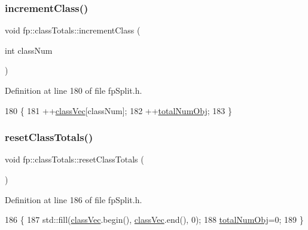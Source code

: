 \subsubsection{\texorpdfstring{increment\+Class()}{incrementClass()}}
{\footnotesize\ttfamily void fp\+::class\+Totals\+::increment\+Class (\begin{DoxyParamCaption}\item[{int}]{class\+Num }\end{DoxyParamCaption})\hspace{0.3cm}{\ttfamily [inline]}}



Definition at line 180 of file fp\+Split.\+h.


\begin{DoxyCode}
180                                                     \{
181                 ++\hyperlink{classfp_1_1classTotals_af96102537592dbda8601d0235dfccfca}{classVec}[classNum];
182                 ++\hyperlink{classfp_1_1classTotals_a97be63e3e4a1b7c553df839034828aae}{totalNumObj};
183             \}
\end{DoxyCode}
\mbox{\label{classfp_1_1classTotals_ab0ad9daa63bc410ae15f344b86386f87}} 
\subsubsection{\texorpdfstring{reset\+Class\+Totals()}{resetClassTotals()}}
{\footnotesize\ttfamily void fp\+::class\+Totals\+::reset\+Class\+Totals (\begin{DoxyParamCaption}{ }\end{DoxyParamCaption})\hspace{0.3cm}{\ttfamily [inline]}}



Definition at line 186 of file fp\+Split.\+h.


\begin{DoxyCode}
186                                           \{
187                 std::fill(\hyperlink{classfp_1_1classTotals_af96102537592dbda8601d0235dfccfca}{classVec}.begin(), \hyperlink{classfp_1_1classTotals_af96102537592dbda8601d0235dfccfca}{classVec}.end(), 0);
188                 \hyperlink{classfp_1_1classTotals_a97be63e3e4a1b7c553df839034828aae}{totalNumObj}=0;
189             \}
\end{DoxyCode}
\mbox{\label{classfp_1_1classTotals_a088c363e5ae669d52e4836bc900d6a73}} 
